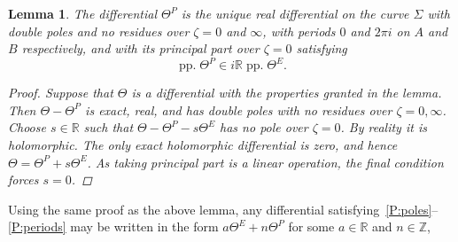 \documentclass{article}
\numberwithin{equation}{section}
\numberwithin{figure}{section}
\newtheorem{lem}[equation]{Lemma}
\renewcommand*{\bar}{\overline}
\newcommand{\bra}[1]{\left(#1\right)}
\DeclareMathOperator{\pp}{pp.}
\DeclareMathOperator{\Real}{Re}
\DeclareMathOperator{\Imag}{Im}
\newcommand{\iu}{i}
\newcommand{\Z}{\mathbb{Z}}
\newcommand{\R}{\mathbb{R}}
\begin{document}
\begin{lem}\label{lem:theta2_characterisation}
The differential $\Theta^P$ is the unique real differential on the curve $\Sigma$ with double poles and no residues over $\zeta=0$ and $\infty$, with periods $0$ and $2\pi\iu$ on $A$ and $B$ respectively, and with its principal part over $\zeta=0$ satisfying
\[
\pp \Theta^P \in \iu \R \pp \Theta^E.
\]
\begin{proof}

Suppose that $\Theta$ is a differential with the properties granted in the lemma. Then $\Theta-\Theta^P$ is exact, real, and has double poles with no residues over $\zeta = 0,\infty$. Choose $s\in\R$ such that $\Theta-\Theta^P - s\Theta^E$ has no pole over $\zeta = 0$. By reality it is holomorphic. The only exact holomorphic differential is zero, and hence $\Theta = \Theta^P + s \Theta^E$.
As taking principal part is a linear operation, the final condition forces $s=0$.
\end{proof}
\end{lem}

Using the same proof as the above lemma, any differential satisfying~\ref{P:poles}--\ref{P:periods} may be written in the form $a \Theta^E + n \Theta^P$ for some $a\in\R$ and $n\in\Z$, 
\end{document}
